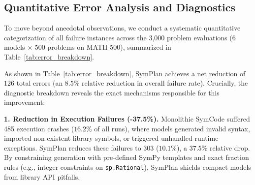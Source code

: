 \documentclass[runningheads]{llncs}
\begin{document}
\subsection{Quantitative Error Analysis and Diagnostics}
\label{sec:error_analysis}

To move beyond anecdotal observations, we conduct a systematic quantitative categorization of all failure instances across the 3,000 problem evaluations (6 models $\times$ 500 problems on MATH-500), summarized in Table~\ref{tab:error_breakdown}.

\begin{table}[t]
\centering
\caption{Quantitative failure mode comparison between SymCode and SymPlan across all 3,000 problem evaluations on MATH-500.}
\label{tab:error_breakdown}
\end{table}

As shown in Table~\ref{tab:error_breakdown}, SymPlan achieves a net reduction of $126$ total errors (an $8.5\%$ relative reduction in overall failure rate). Crucially, the diagnostic breakdown reveals the exact mechanisms responsible for this improvement:

\textbf{1. Reduction in Execution Failures (-37.5\%).} Monolithic SymCode suffered 485 execution crashes ($16.2\%$ of all runs), where models generated invalid syntax, imported non-existent library symbols, or triggered unhandled runtime exceptions. SymPlan reduces these failures to 303 ($10.1\%$), a $37.5\%$ relative drop. By constraining generation with pre-defined SymPy templates and exact fraction rules (e.g., integer constraints on \texttt{sp.Rational}), SymPlan shields compact models from library API pitfalls.
\end{document}
